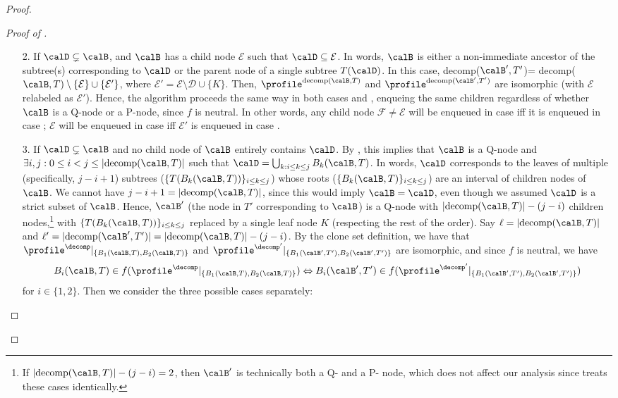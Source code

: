 \begin{proof}
\begin{proof}[Proof of ]
\begin{enumerate}
            \item[2.] If $\calD \subsetneq \calB$, and $\calB$ has a child node $\mathcal{E}$ such that $\calD \subseteq \mathcal{E}$. In words, $\calB$ is either a non-immediate ancestor of the subtree(s) corresponding to $\calD$ or the parent node of a single subtree $T(\calD)$. In this case, decomp($\calB',T'$)=  decomp($\calB,T)\setminus \{\mathcal{E}\} \cup \{\mathcal{E}'\}$, where $\mathcal{E}'=\mathcal{E} \setminus \mathcal{D} \cup \{K\}$. Then, $\profile^{\text{decomp}(\calB,T)}$ and $\profile^{\text{decomp}(\calB',T')}$ are isomorphic (with $\mathcal{E}$ relabeled as $\mathcal{E}'$). Hence, the algorithm proceeds the same way in both cases \casea and \caseb, enqueing the same children regardless of whether $\calB$ is a Q-node or a P-node, since $f$ is neutral. In other words, any child node $\mathcal{F} \neq \mathcal{E}$ will be enqueued in case \casea iff it is enqueued in case \caseb; $\mathcal{E}$ will be enqueued in case \casea iff $\mathcal{E}'$ is enqueued in case \caseb.
            \item[3.] If $\calD \subsetneq \calB$ and no child node of $\calB$ entirely contains $\calD$. By , this implies that $\calB$ is a Q-node and $\exists i,j: 0 \leq i < j \leq |\text{decomp}(\calB,T)|$ such that $\calD=\bigcup_{k: i \leq k \leq j} B_k(\calB, T)$. In words, $\calD$ corresponds to the leaves of multiple (specifically, $j-i+1$) subtrees ($\{T(B_k(\calB,T))\}_{i \leq k \leq j}$) whose roots ($\{B_k(\calB,T)\}_{i \leq k \leq j}$) are an interval of children nodes of $\calB$. We cannot have $j-i+1 =|\text{decomp}(\calB,T)|$, since this would imply $\calB= \calD$, even though we assumed $\calD$ is a strict subset of $\calB$. Hence, $\calB'$ (the node in $T'$ corresponding to $\calB$) is a Q-node with $|\text{decomp}(\calB,T)|-(j-i)$ children nodes,\footnote{If $|\text{decomp}(\calB,T)|-(j-i)=2$, then $\calB'$ is technically both a Q- and a P- node, which does not affect our analysis since  treats these cases identically.} with $\{T(B_k(\calB,T))\}_{i \leq k \leq j}$ replaced by a single leaf node $K$ (respecting the rest of the order). Say $\ell = |\text{decomp}(\calB,T)|$ and $\ell'=|\text{decomp}(\calB',T')|=|\text{decomp}(\calB,T)|-(j-i)$. By the clone set definition, we have that $\profile^\decomp|_{\{B_1(\calB,T),B_2(\calB,T)\}}$ and $\profile^{\decomp'}|_{\{B_1(\calB',T'),B_2(\calB',T')\}}$ are isomorphic, and since $f$ is neutral, we have  $$B_i(\calB,T)\in f(\profile^\decomp|_{\{B_1(\calB,T),B_2(\calB,T)\}}) \Leftrightarrow B_i(\calB',T')\in f(\profile^{\decomp'}|_{\{B_1(\calB',T'),B_2(\calB',T')\}})$$ for $i \in \{1,2\}$. Then we consider the three possible cases separately:

\end{enumerate}
\end{proof}
\end{proof}
